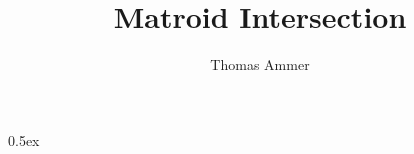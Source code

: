 \documentclass[11pt,a4paper]{report}
\begin{document}
\title{Matroid Intersection}
\author{Thomas Ammer}
\maketitle

\tableofcontents

\parindent 0pt\parskip 0.5ex



%
%
\end{document}
